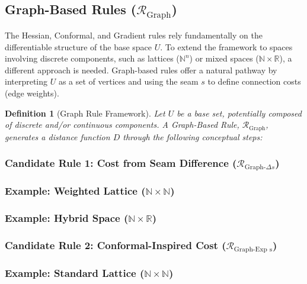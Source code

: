 \documentclass[twoside,twocolumn]{article}
\newtheorem{definition}{Definition}[subsection] %
\begin{document}
\subsection{Graph-Based Rules ($\mathcal{R}_{\text{Graph}}$)}
\setcounter{definition}{0}

The Hessian, Conformal, and Gradient rules rely fundamentally on the differentiable structure of the base space $U$. To extend the framework to spaces involving discrete components, such as lattices ($\mathbb{N}^n$) or mixed spaces ($\mathbb{N} \times \mathbb{R}$), a different approach is needed. Graph-based rules offer a natural pathway by interpreting $U$ as a set of vertices and using the seam $s$ to define connection costs (edge weights).

\begin{definition}[Graph Rule Framework]
Let $U$ be a base set, potentially composed of discrete and/or continuous components. A \emph{Graph-Based Rule}, $\mathcal{R}_{\text{Graph}}$, generates a distance function $D$ through the following conceptual steps:
\end{definition}


\subsubsection{Candidate Rule 1: Cost from Seam Difference ($\mathcal{R}_{\text{Graph-}\Delta s}$)}
\subsubsection{Example: Weighted Lattice ($\mathbb{N} \times \mathbb{N}$)}
\subsubsection{Example: Hybrid Space ($\mathbb{N} \times \mathbb{R}$)}
\subsubsection{Candidate Rule 2: Conformal-Inspired Cost ($\mathcal{R}_{\text{Graph-Exp s}}$)}
\subsubsection{Example: Standard Lattice ($\mathbb{N} \times \mathbb{N}$)}
\end{document}
